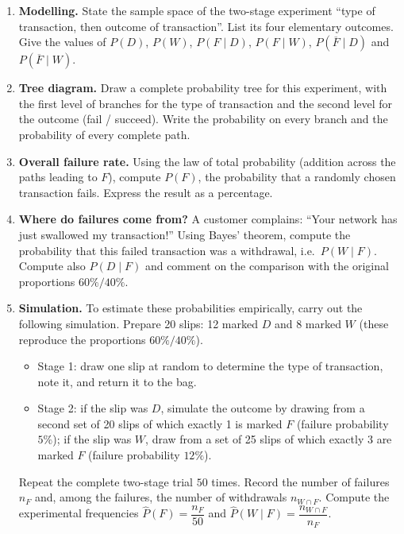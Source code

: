 \documentclass[11pt]{article}
\newcounter{popsec}
\newcounter{popsub}
\newcommand{\courssub}[1]{%
  \stepcounter{popsub}%
  \par\vspace{9pt}\noindent{\popxbold\fontsize{11.5}{13}\selectfont\color{popink}{\color{poporange}\thepopsec.\thepopsub}\hspace{6pt}#1}\par\nopagebreak\vspace{4pt}
}
\begin{document}
\courssub{Tasks}

\begin{enumerate}
\item \textbf{Modelling.} State the sample space of the two-stage experiment ``type of transaction, then outcome of transaction''. List its four elementary outcomes. Give the values of $P(D)$, $P(W)$, $P(F\mid D)$, $P(F\mid W)$, $P(\overline{F}\mid D)$ and $P(\overline{F}\mid W)$.

\item \textbf{Tree diagram.} Draw a complete probability tree for this experiment, with the first level of branches for the type of transaction and the second level for the outcome (fail / succeed). Write the probability on every branch and the probability of every complete path.

\item \textbf{Overall failure rate.} Using the law of total probability (addition across the paths leading to $F$), compute $P(F)$, the probability that a randomly chosen transaction fails. Express the result as a percentage.

\item \textbf{Where do failures come from?} A customer complains: ``Your network has just swallowed my transaction!'' Using Bayes' theorem, compute the probability that this failed transaction was a withdrawal, i.e.\ $P(W\mid F)$. Compute also $P(D\mid F)$ and comment on the comparison with the original proportions $60\%/40\%$.

\item \textbf{Simulation.} To estimate these probabilities empirically, carry out the following simulation. Prepare 20 slips: 12 marked $D$ and 8 marked $W$ (these reproduce the proportions $60\%/40\%$).
\begin{itemize}
\item Stage 1: draw one slip at random to determine the type of transaction, note it, and return it to the bag.
\item Stage 2: if the slip was $D$, simulate the outcome by drawing from a second set of 20 slips of which exactly 1 is marked $F$ (failure probability $5\%$); if the slip was $W$, draw from a set of 25 slips of which exactly 3 are marked $F$ (failure probability $12\%$).
\end{itemize}
Repeat the complete two-stage trial $50$ times. Record the number of failures $n_F$ and, among the failures, the number of withdrawals $n_{W\cap F}$. Compute the experimental frequencies $\widehat{P}(F)=\dfrac{n_F}{50}$ and $\widehat{P}(W\mid F)=\dfrac{n_{W\cap F}}{n_F}$.


\end{enumerate}
\end{document}
